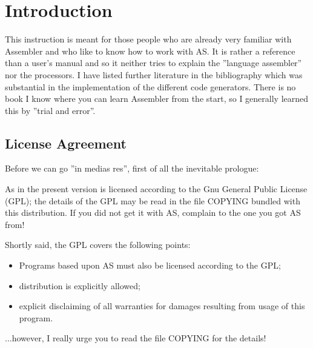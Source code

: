 \documentclass[12pt,twoside]{report}
\begin{document}

\cleardoublepage
\chapter{Introduction}

This instruction is meant for those people who are already very familiar
with Assembler and who like to know how to work with AS.  It is rather a
reference than a user's manual and so it neither tries to explain the
''language assembler'' nor the processors.  I have listed further
literature in the bibliography which was substantial in the implementation
of the different code generators.  There is no book I know where you can
learn Assembler from the start, so I generally learned this by ''trial and
error''.


\section{License Agreement}
\label{SectLicense}

Before we can go ''in medias res'', first of all the inevitable prologue:

As in the present version is licensed according to the Gnu General Public
License (GPL); the details of the GPL may be read in the file COPYING
bundled with this distribution.  If you did not get it with AS, complain
to the one you got AS from!

Shortly said, the GPL covers the following points:
\begin{itemize}
\item{Programs based upon AS must also be licensed according to the GPL;}
\item{distribution is explicitly allowed;}
\item{explicit disclaiming of all warranties for damages resulting from
      usage of this program.}
\end{itemize}
...however, I really urge you to read the file COPYING for the details!
\end{document}
